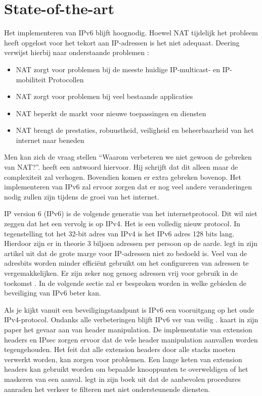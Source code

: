
\section{State-of-the-art}%
\label{sec:state-of-the-art}

Het implementeren van IPv6 blijft hoognodig. Hoewel NAT tijdelijk het probleem heeft opgelost voor het tekort aan IP-adressen is het niet adequaat. Deering verwijst hierbij naar onderstaande problemen \autocite{deering2000ipv6}:

\begin{itemize}
    \item	NAT zorgt voor problemen bij de meeste huidige IP-multicast- en IP-mobiliteit Protocollen 
    \item	NAT zorgt voor problemen bij veel bestaande applicaties  
    \item	NAT beperkt de markt voor nieuwe toepassingen en diensten
    \item	NAT brengt de prestaties, robuustheid, veiligheid en beheerbaarheid van het internet naar beneden
\end{itemize}
Men kan zich de vraag stellen “Waarom verbeteren we niet gewoon de gebreken van NAT?”. \textcite{deering2000ipv6} heeft een antwoord hiervoor. Hij schrijft dat dit alleen maar de complexiteit zal verhogen. Bovendien komen er extra gebreken bovenop. Het implementeren van IPv6 zal ervoor zorgen dat er nog veel andere veranderingen nodig zullen zijn tijdens de groei van het internet.

IP version 6 (IPv6) is de volgende generatie van het internetprotocol. Dit wil niet zeggen dat het een vervolg is op IPv4. Het is een volledig nieuw protocol. In tegenstelling tot het 32-bit adres van IPv4 is het IPv6 adres 128 bits lang. Hierdoor zijn er in theorie 3 biljoen adressen per persoon op de aarde. \textcite{andress2005ipv6} legt in zijn artikel uit dat de grote marge voor IP-adressen niet zo bedoeld is. Veel van de adresbits worden minder efficiënt gebruikt om het configureren van adressen te vergemakkelijken. Er zijn zeker nog genoeg adressen vrij voor gebruik in de toekomst \autocite{andress2005ipv6}. In de volgende sectie zal er besproken worden in welke gebieden de beveiliging van IPv6 beter kan.

Als je kijkt vanuit een beveiligingstandpunt is IPv6 een vooruitgang op het oude IPv4-protocol. Ondanks alle verbeteringen blijft IPv6 ver van veilig \autocite{sotillo2006ipv6}.
\textcite{sotillo2006ipv6} kaart in zijn paper het gevaar aan van header manipulation. De implementatie van extension headers en IPsec zorgen ervoor dat de vele header manipulation aanvallen worden tegengehouden. Het feit dat alle extension headers door alle stacks moeten verwerkt worden, kan zorgen voor problemen. Een lange keten van extension headers kan gebruikt worden om bepaalde knooppunten te overweldigen of het maskeren van een aanval. \textcite{boek1} legt in zijn boek uit dat de aanbevolen procedures aanraden het verkeer te filteren met niet ondersteunende diensten. 

